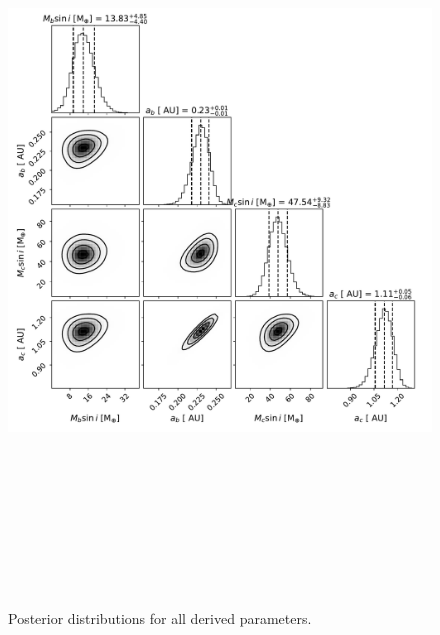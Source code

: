 \documentclass{emulateapj}
\begin{document}
\begin{figure}[!h]
\centering

\includegraphics[height=8.0in,width=6.0in,keepaspectratio]{TOI-1751_default_corner_derived_pars.pdf}
\caption{Posterior distributions for all derived parameters.}
\end{figure} 

\end{document}
